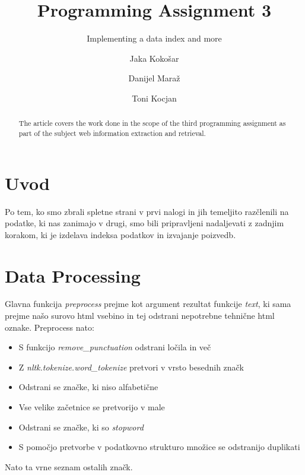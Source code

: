 \documentclass[runningheads]{llncs}
\begin{document}
\title{Programming Assignment 3}
\subtitle{Implementing a data index and more}

\author{
  Jaka Kokošar
  \and
  Danijel Maraž
  \and
  Toni Kocjan
}


\maketitle             

\begin{abstract}
The article covers the work done in the scope of the third programming assignment as part of the subject web information extraction and retrieval. 

\end{abstract}

\section{Uvod}
Po tem, ko smo zbrali spletne strani v prvi nalogi in jih temeljito razčlenili na podatke, ki nas zanimajo v drugi, smo bili pripravljeni nadaljevati z zadnjim korakom, ki je izdelava indeksa podatkov in izvajanje poizvedb.

\section{Data Processing}
Glavna funkcija \textit{preprocess} prejme kot argument rezultat funkcije \textit{text}, ki sama prejme našo surovo html vsebino in tej odstrani nepotrebne tehnične html oznake. Preprocess nato:
\begin{itemize}
\item S funkcijo \textit{remove\_punctuation} odstrani ločila in več
\item Z \textit{nltk.tokenize.word\_tokenize} pretvori v vrsto besednih značk
\item Odstrani se značke, ki niso alfabetične
\item Vse velike začetnice se pretvorijo v male
\item Odstrani se značke, ki so \textit{stopword}
\item S pomočjo pretvorbe v podatkovno strukturo množice se odstranijo duplikati
\end{itemize} 
Nato ta vrne seznam ostalih značk.
\end{document}

